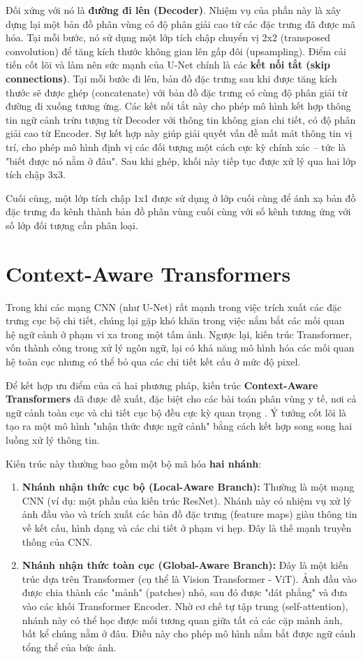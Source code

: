Đối xứng với nó là \textbf{đường đi lên (Decoder)}. Nhiệm vụ của phần này là xây dựng lại một bản đồ phân vùng có độ phân giải cao từ các đặc trưng đã được mã hóa. Tại mỗi bước, nó sử dụng một lớp tích chập chuyển vị 2x2 (transposed convolution) để tăng kích thước không gian lên gấp đôi (upsampling). Điểm cải tiến cốt lõi và làm nên sức mạnh của U-Net chính là các \textbf{kết nối tắt (skip connections)}. Tại mỗi bước đi lên, bản đồ đặc trưng sau khi được tăng kích thước sẽ được ghép (concatenate) với bản đồ đặc trưng có cùng độ phân giải từ đường đi xuống tương ứng. Các kết nối tắt này cho phép mô hình kết hợp thông tin ngữ cảnh trừu tượng từ Decoder với thông tin không gian chi tiết, có độ phân giải cao từ Encoder. Sự kết hợp này giúp giải quyết vấn đề mất mát thông tin vị trí, cho phép mô hình định vị các đối tượng một cách cực kỳ chính xác – tức là "biết được nó nằm ở đâu". Sau khi ghép, khối này tiếp tục được xử lý qua hai lớp tích chập 3x3.

Cuối cùng, một lớp tích chập 1x1 được sử dụng ở lớp cuối cùng để ánh xạ bản đồ đặc trưng đa kênh thành bản đồ phân vùng cuối cùng với số kênh tương ứng với số lớp đối tượng cần phân loại.
\section{Context-Aware Transformers}
Trong khi các mạng CNN (như U-Net) rất mạnh trong việc trích xuất các đặc trưng cục bộ chi tiết, chúng lại gặp khó khăn trong việc nắm bắt các mối quan hệ ngữ cảnh ở phạm vi xa  trong một tấm ảnh. Ngược lại, kiến trúc Transformer, vốn thành công trong xử lý ngôn ngữ, lại có khả năng mô hình hóa các mối quan hệ toàn cục nhưng có thể bỏ qua các chi tiết kết cấu ở mức độ pixel.

Để kết hợp ưu điểm của cả hai phương pháp, kiến trúc \textbf{Context-Aware Transformers} đã được đề xuất, đặc biệt cho các bài toán phân vùng y tế, nơi cả ngữ cảnh toàn cục và chi tiết cục bộ đều cực kỳ quan trọng \cite{windsor2022context}. Ý tưởng cốt lõi là tạo ra một mô hình "nhận thức được ngữ cảnh" bằng cách kết hợp song song hai luồng xử lý thông tin.

Kiến trúc này thường bao gồm một bộ mã hóa \textbf{hai nhánh}:
\begin{enumerate}
    \item \textbf{Nhánh nhận thức cục bộ (Local-Aware Branch):} Thường là một mạng CNN (ví dụ: một phần của kiến trúc ResNet). Nhánh này có nhiệm vụ xử lý ảnh đầu vào và trích xuất các bản đồ đặc trưng (feature maps) giàu thông tin về kết cấu, hình dạng và các chi tiết ở phạm vi hẹp. Đây là thế mạnh truyền thống của CNN.

    \item \textbf{Nhánh nhận thức toàn cục (Global-Aware Branch):} Đây là một kiến trúc dựa trên Transformer (cụ thể là Vision Transformer - ViT). Ảnh đầu vào được chia thành các "mảnh" (patches) nhỏ, sau đó được "dát phẳng" và đưa vào các khối Transformer Encoder. Nhờ cơ chế tự tập trung (self-attention), nhánh này có thể học được mối tương quan giữa tất cả các cặp mảnh ảnh, bất kể chúng nằm ở đâu. Điều này cho phép mô hình nắm bắt được ngữ cảnh tổng thể của bức ảnh.
\end{enumerate}

